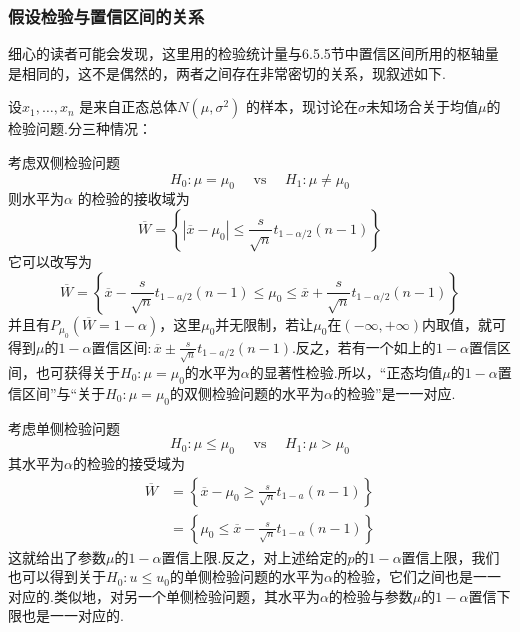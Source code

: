 \subsubsection{假设检验与置信区间的关系}

细心的读者可能会发现，这里用的检验统计量与6.5.5节中置信区间所用的枢轴量是相同的，这不是偶然的，两者之间存在非常密切的关系，现叙述如下.

设$x_{1},\dotsc,x_{n}$ 是来自正态总体$N(\mu,\sigma^{2})$ 的样本，现讨论在$\sigma$未知场合关于均值$\mu $的检验问题.分三种情况：

考虑双侧检验问题
\[H _ { 0 } : \mu = \mu _ { 0 } \quad \text { vs } \quad H _ { 1 } : \mu \neq \mu _ { 0 }\]
则水平为$\alpha$ 的检验的接收域为
\[
\overline{W}=\left\{\left|\overline{x}-\mu_0\right|\leq\frac{s}{\sqrt{n}}t_{1-\alpha/2}\left(n-1\right)\right\}
\]
它可以改写为
\[
\overline{W}=\left\{\overline{x}-\frac{s}{\sqrt{n}}t_{1-a/2}\left(n-1\right)\le\mu_0\le\overline{x}+\frac{s}{\sqrt{n}}t_{1-\alpha/2}\left(n-1\right)\right\}
\]
并且有$P_{\mu_{ 0 }}(\overline{ W }=1-\alpha)$，这里$\mu_{ 0 }$并无限制，若让$\mu_{ 0 }$在$(-\infty,+\infty)$内取值，就可得到$\mu $的$1-\alpha$置信区间$:\overline { x } \pm \frac { s } { \sqrt { n } } t _ { 1 - a / 2 } ( n - 1 )$.反之，若有一个如上的$1-\alpha$置信区间，也可获得关于$H_{0}:\mu =\mu_{ 0 }$的水平为$\alpha$的显著性检验.所以，“正态均值$\mu$的$1-\alpha$置信区间”与“关于$H_{0}:\mu =\mu_{ 0 }$的双侧检验问题的水平为$\alpha$的检验”是一一对应.

考虑单侧检验问题
\[H _ { 0 } : \mu \leq  \mu _ { 0 } \quad \text { vs } \quad H _ { 1 } : \mu > \mu _ { 0 }\]
其水平为$\alpha$的检验的接受域为
\begin{align*}
\overline { W }& = \left\{ \overline { x } - \mu _ { 0 } \geq \frac { s } { \sqrt { n } } t _ { 1 - a } ( n - 1 ) \right\}\\
&= \left\{ \mu _ { 0 } \leq \overline { x } - \frac { s } { \sqrt { n } } t _ { 1 - \alpha } ( n - 1 ) \right\}
\end{align*}
这就给出了参数$\mu$的$1-\alpha$置信上限.反之，对上述给定的$p$的$1-\alpha$置信上限，我们也可以得到关于$H_{0}:u\leq u_{0}$的单侧检验问题的水平为$\alpha$的检验，它们之间也是一一对应的.类似地，对另一个单侧检验问题，其水平为$\alpha$的检验与参数$\mu$的$1-\alpha$置信下限也是一一对应的.
